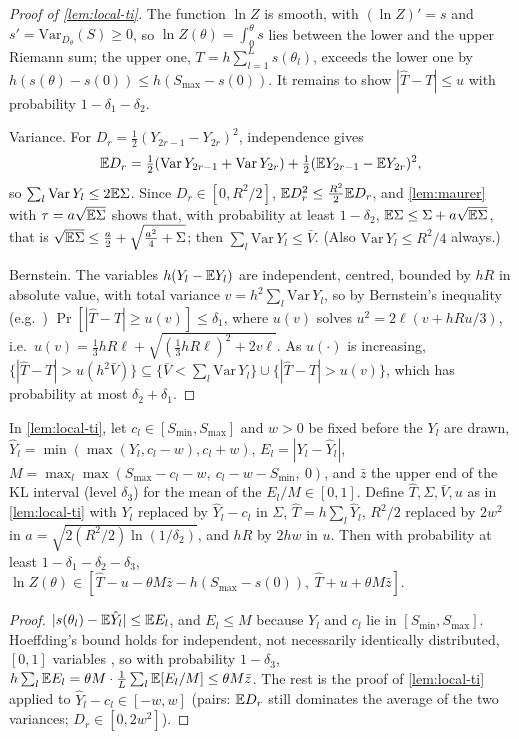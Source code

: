 \begin{proof}[Proof of \cref{lem:local-ti}]
The function $\ln Z$ is smooth, with $(\ln Z)'=s$ and
$s'=\mathrm{Var}_{D_\theta}(S)\ge0$, so $\ln Z(\theta)=\int_0^\theta s$ lies between the lower and
the upper Riemann sum; the upper one, $T=h\sum_{l=1}^Ls(\theta_l)$, exceeds the lower one
by $h(s(\theta)-s(0))\le h(S_{\max}-s(0))$. It remains to show $|\hat T-T|\le u$ with probability
$1-\delta_1-\delta_2$.

Variance. For $D_r=\frac12(Y_{2r-1}-Y_{2r})^2$, independence gives
\[
\mathbb{E} D_r=\tfrac12(\mathrm{Var}\,Y_{2r-1}+\mathrm{Var}\,Y_{2r})+\tfrac12(\mathbb{E} Y_{2r-1}-\mathbb{E} Y_{2r})^2,
\]
so $\sum_l\mathrm{Var}\,Y_l\le2\mathbb{E}\Sigma$. Since
$D_r\in[0,R^2/2]$, $\mathbb{E} D_r^2\le\frac{R^2}2\mathbb{E} D_r$, and \cref{lem:maurer} with
$\tau=a\sqrt{\mathbb{E}\Sigma}$ shows that, with probability at least $1-\delta_2$,
$\mathbb{E}\Sigma\le\Sigma+a\sqrt{\mathbb{E}\Sigma}$, that is $\sqrt{\mathbb{E}\Sigma}\le\frac a2+\sqrt{\frac{a^2}4+\Sigma}$; then
$\sum_l\mathrm{Var}\,Y_l\le\bar V$. (Also $\mathrm{Var}\,Y_l\le R^2/4$ always.)

Bernstein. The variables $h(Y_l-\mathbb{E} Y_l)$ are independent, centred, bounded by $hR$ in absolute
value, with total variance $v=h^2\sum_l\mathrm{Var}\,Y_l$, so by Bernstein's inequality
(e.g.\ \cite[Chapter~2]{blm2013}) $\Pr[|\hat T-T|\ge u(v)]\le\delta_1$, where $u(v)$ solves
$u^2=2\ell(v+hRu/3)$, i.e.\ $u(v)=\frac13hR\ell+\sqrt{(\frac13hR\ell)^2+2v\ell}$. As $u(\cdot)$ is
increasing, $\{|\hat T-T|>u(h^2\bar V)\}\subseteq\{\bar V<\sum_l\mathrm{Var}\,Y_l\}\cup\{|\hat T-T|>u(v)\}$, which
has probability at most $\delta_2+\delta_1$.
\end{proof}

\begin{lemma}[windows]\label{lem:local-ti-window}
In \cref{lem:local-ti}, let $c_l\in[S_{\min},S_{\max}]$ and $w>0$ be fixed before the $Y_l$ are
drawn, $\hat Y_l=\min(\max(Y_l,c_l-w),c_l+w)$, $E_l=|Y_l-\hat Y_l|$,
$M=\max_l\max(S_{\max}-c_l-w,\ c_l-w-S_{\min},\ 0)$, and $\bar z$ the upper end of the KL interval
(level $\delta_3$) for the mean of the $E_l/M\in[0,1]$. Define $\hat T,\Sigma,\bar V,u$ as in
\cref{lem:local-ti} with $Y_l$ replaced by $\hat Y_l-c_l$ in $\Sigma$, $\hat T=h\sum_l\hat Y_l$,
$R^2/2$ replaced by $2w^2$ in $a=\sqrt{2(R^2/2)\ln(1/\delta_2)}$, and $hR$ by $2hw$ in $u$. Then with
probability at least $1-\delta_1-\delta_2-\delta_3$,
$\ln Z(\theta)\in[\hat T-u-\theta M\bar z-h(S_{\max}-s(0)),\ \hat T+u+\theta M\bar z]$.
\end{lemma}

\begin{proof}
$|s(\theta_l)-\mathbb{E}\hat Y_l|\le\mathbb{E} E_l$, and $E_l\le M$ because $Y_l$ and $c_l$ lie in
$[S_{\min},S_{\max}]$. Hoeffding's bound holds for independent, not necessarily identically
distributed, $[0,1]$ variables \cite{hoeffding1963}, so with probability $1-\delta_3$,
$h\sum_l\mathbb{E} E_l=\theta M\cdot\frac1L\sum_l\mathbb{E}[E_l/M]\le\theta M\bar z$. The rest is the proof of
\cref{lem:local-ti} applied to $\hat Y_l-c_l\in[-w,w]$ (pairs: $\mathbb{E} D_r$ still dominates the
average of the two variances; $D_r\in[0,2w^2]$).
\end{proof}

